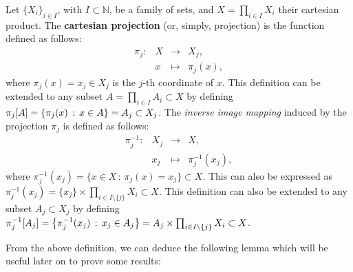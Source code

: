 \begin{definition}
	\label{def:projection}
	Let $\{X_i\}_{i\in I}$, with $I\subset\mathbb{N}$, be a family of sets, and
	$X=\prod_{i\in I} X_i$ their cartesian product.
	The \textbf{cartesian projection} (or, simply, projection) is the function defined as follows:
	$$
  	\begin{array}{rrcl}
		\pi_j : & X &\longrightarrow & X_j,\\
		 & x &\longmapsto     & \pi_j(x),
  	\end{array}
	$$
	where $\pi_j(x)=x_j \in X_j$ is the $j$-th coordinate of $x$.
	This definition can be extended to any subset $A=\prod_{i\in I}A_i\subset X$
	by defining $\pi_j[A] = \setdef{\pi_j(x)}{x\in A}\linebreak = A_j\subset X_j$.
	The \emph{inverse image mapping} induced by the projection $\pi_j$ is defined as follows:
	$$
		\begin{array}{rrcl}
			\pi^{-1}_j : & X_j &\longrightarrow & X,\\
			 & x_j &\longmapsto     & \pi^{-1}_j(x_j),
		\end{array}
	$$
	where $\pi^{-1}_j(x_j)=\{x\in X\,:\,\pi_j(x)=x_j\} \subset X$.
	This can also be expressed as $\pi^{-1}_j(x_j) = \{x_j\} \times \prod_{i\in I\setminus\{j\}}X_i \subset X$.
	This definition can also be extended to any subset $A_j\subset X_j$ by defining
	$\pi^{-1}_j[A_j]=\left\{\pi^{-1}_j(x_j)\,:\,x_j\in A_j\right\}=A_j\times\prod_{i\in I\setminus\{j\}}X_i\subset X$.
\end{definition}

From the above definition, we can deduce the following lemma which will be useful later on to prove some results:

